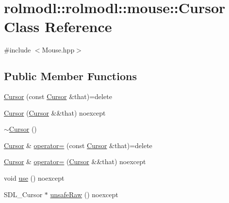 \hypertarget{classrolmodl_1_1rolmodl_1_1mouse_1_1_cursor}{}\section{rolmodl\+::rolmodl\+::mouse\+::Cursor Class Reference}
\label{classrolmodl_1_1rolmodl_1_1mouse_1_1_cursor}


{\ttfamily \#include $<$Mouse.\+hpp$>$}

\subsection*{Public Member Functions}
\begin{DoxyCompactItemize}
\item 
\mbox{\hyperlink{classrolmodl_1_1rolmodl_1_1mouse_1_1_cursor_a24d635cd5e969777793fd83003609be9}{Cursor}} (const \mbox{\hyperlink{classrolmodl_1_1rolmodl_1_1mouse_1_1_cursor}{Cursor}} \&that)=delete
\item 
\mbox{\hyperlink{classrolmodl_1_1rolmodl_1_1mouse_1_1_cursor_a0b602c4c37028591cbd5ad24825c250b}{Cursor}} (\mbox{\hyperlink{classrolmodl_1_1rolmodl_1_1mouse_1_1_cursor}{Cursor}} \&\&that) noexcept
\item 
\mbox{\hyperlink{classrolmodl_1_1rolmodl_1_1mouse_1_1_cursor_aede167a97c27c9a5581ede68ab60064c}{$\sim$\+Cursor}} ()
\item 
\mbox{\hyperlink{classrolmodl_1_1rolmodl_1_1mouse_1_1_cursor}{Cursor}} \& \mbox{\hyperlink{classrolmodl_1_1rolmodl_1_1mouse_1_1_cursor_a770f615e1a29e2ce0cd6fae2269c6556}{operator=}} (const \mbox{\hyperlink{classrolmodl_1_1rolmodl_1_1mouse_1_1_cursor}{Cursor}} \&that)=delete
\item 
\mbox{\hyperlink{classrolmodl_1_1rolmodl_1_1mouse_1_1_cursor}{Cursor}} \& \mbox{\hyperlink{classrolmodl_1_1rolmodl_1_1mouse_1_1_cursor_a62947d22469e889189788fefd4efe1ca}{operator=}} (\mbox{\hyperlink{classrolmodl_1_1rolmodl_1_1mouse_1_1_cursor}{Cursor}} \&\&that) noexcept
\item 
void \mbox{\hyperlink{classrolmodl_1_1rolmodl_1_1mouse_1_1_cursor_a2c9c9150056508772fdf219f9510c7bf}{use}} () noexcept
\item 
S\+D\+L\+\_\+\+Cursor $\ast$ \mbox{\hyperlink{classrolmodl_1_1rolmodl_1_1mouse_1_1_cursor_a10d0d971261c62ae0cf2f68a4a9bd6ad}{unsafe\+Raw}} () noexcept
\end{DoxyCompactItemize}

